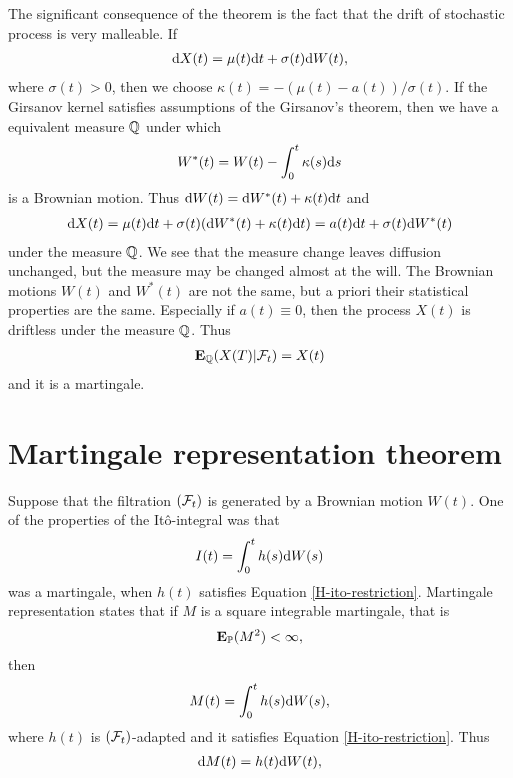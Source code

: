 The significant consequence of the theorem is the fact that the drift of stochastic process is very malleable. If   
  \begin{align}
    \mathrm{d} X(t) = \mu(t) \mathrm{d} t + \sigma(t) \mathrm{d} W(t),
  \end{align}
where $\sigma(t) > 0$, then we choose $\kappa(t) = - (\mu(t) - a(t)) / \sigma(t)$. If the Girsanov kernel satisfies assumptions of the Girsanov's theorem, then we have a equivalent measure $\mathbb{Q}$ under which
  \begin{align}
    W^*(t) = W(t) - \int_0^t \kappa(s) \mathrm{d} s
  \end{align}
is a Brownian motion. Thus $\mathrm{d} W(t) = \mathrm{d} W^*(t) + \kappa(t) \mathrm{d} t$ and
  \begin{align}
    \mathrm{d} X(t) = \mu(t) \mathrm{d} t + \sigma(t) (\mathrm{d} W^*(t) + \kappa(t) \mathrm{d} t) = a(t) \mathrm{d} t + \sigma(t) \mathrm{d} W^* (t)
  \end{align}
under the measure $\mathbb{Q}$. We see that the measure change leaves diffusion unchanged, but the measure may be changed almost at the will. The Brownian motions $W(t)$ and $W^*(t)$ are not the same, but a priori their statistical properties are the same. Especially if $a(t) \equiv 0$, then the process $X(t)$ is driftless under the measure $\mathbb{Q}$. Thus
  \begin{align}
    \operatorname{\boldsymbol{\mathrm{E}}}_{\mathbb{Q}} (X(T) | \mathcal{F}_t) = X(t)
  \end{align}
and it is a martingale.

\section{Martingale representation theorem}

Suppose that the filtration $(\mathcal{F}_t)$ is generated by a Brownian motion $W(t)$. One of the properties of the It\^{o}-integral was that
	\begin{align}
		I(t) = \int_0^t h(s) \mathrm{d} W(s)
	\end{align}
was a martingale, when $h(t)$ satisfies Equation \ref{H-ito-restriction}. Martingale representation states that if $M$ is a square integrable martingale, that is
	\begin{align}
		\operatorname{\boldsymbol{\mathrm{E}}}_{\mathbb{P}} (M^2) < \infty ,
	\end{align}
then
	\begin{align}
		M(t) = \int_0^t h(s) \mathrm{d} W(s),
	\end{align}
where $h(t)$ is $(\mathcal{F}_t)$-adapted and it satisfies Equation \ref{H-ito-restriction}. Thus
	\begin{align}
		\mathrm{d} M(t) =  h(t) \mathrm{d} W(t),
	\end{align}
  
